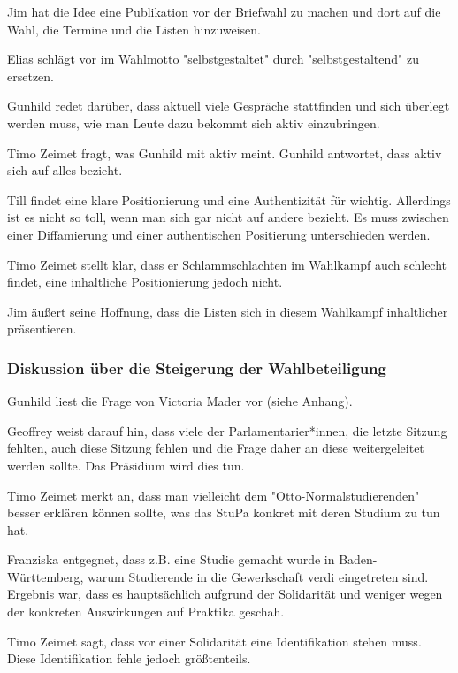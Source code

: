\documentclass[ngerman,headheight=70pt]{scrartcl}
\begin{document}
    Jim hat die Idee eine Publikation vor der Briefwahl zu machen und dort auf
    die Wahl, die Termine und die Listen hinzuweisen.

    Elias schlägt vor im Wahlmotto "selbstgestaltet" durch "selbstgestaltend"
    zu ersetzen.

    Gunhild redet darüber, dass aktuell viele Gespräche stattfinden und sich überlegt
    werden muss, wie man Leute dazu bekommt sich aktiv einzubringen.

    Timo Zeimet fragt, was Gunhild mit aktiv meint. Gunhild antwortet, dass aktiv
    sich auf alles bezieht.

    Till findet eine klare Positionierung und eine Authentizität für wichtig.
    Allerdings ist es nicht so toll, wenn man sich gar nicht auf andere bezieht.
    Es muss zwischen einer Diffamierung und einer authentischen Positierung
    unterschieden werden.

    Timo Zeimet stellt klar, dass er Schlammschlachten im Wahlkampf auch schlecht
    findet, eine inhaltliche Positionierung jedoch nicht.

    Jim äußert seine Hoffnung, dass die Listen sich in diesem Wahlkampf inhaltlicher
    präsentieren.

    \subsubsection{Diskussion über die Steigerung der Wahlbeteiligung}

    Gunhild liest die Frage von Victoria Mader vor (siehe Anhang).

    Geoffrey weist darauf hin, dass viele der Parlamentarier*innen, die letzte Sitzung
    fehlten, auch diese Sitzung fehlen und die Frage daher an diese weitergeleitet
    werden sollte. Das Präsidium wird dies tun.

    Timo Zeimet merkt an, dass man vielleicht dem "Otto-Normalstudierenden"
    besser erklären können sollte, was das StuPa konkret mit deren Studium zu tun
    hat.

    Franziska entgegnet, dass z.B. eine Studie gemacht wurde in Baden-Württemberg,
    warum Studierende in die Gewerkschaft verdi eingetreten sind. Ergebnis war, dass
    es hauptsächlich aufgrund der Solidarität und weniger wegen der konkreten
    Auswirkungen auf Praktika geschah.

    Timo Zeimet sagt, dass vor einer Solidarität eine Identifikation stehen muss.
    Diese Identifikation fehle jedoch größtenteils.
\end{document}
